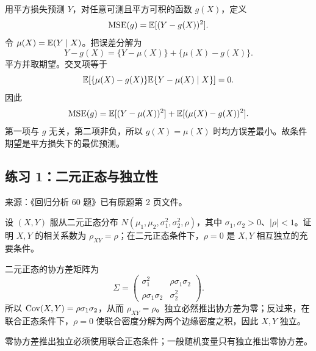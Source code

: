 \begin{proposition}\label{hw:reg:note:1:3}
用平方损失预测 $Y$，对任意可测且平方可积的函数 $g(X)$，定义
\[
\operatorname{MSE}(g)=\mathbb{E}[(Y-g(X))^2].
\]
令 $\mu(X)=\mathbb{E}(Y\mid X)$。把误差分解为
\[
Y-g(X)=\{Y-\mu(X)\}+\{\mu(X)-g(X)\}.
\]
平方并取期望。交叉项等于
\[
\mathbb{E}\!\left[\{\mu(X)-g(X)\}\mathbb{E}\{Y-\mu(X)\mid X\}\right]=0.
\]
因此
\[
\operatorname{MSE}(g)
=\mathbb{E}[(Y-\mu(X))^2]+\mathbb{E}[(\mu(X)-g(X))^2].
\]
第一项与 $g$ 无关，第二项非负，所以 $g(X)=\mu(X)$ 时均方误差最小。故条件期望是平方损失下的最优预测。
\end{proposition}


\subsection*{练习 1：二元正态与独立性}
\begin{homework}[练习 1]
\textsf{来源：《回归分析 60 题》已有原题第 2 页文件。}\par
设 $(X,Y)$ 服从二元正态分布 $N(\mu_1,\mu_2,\sigma_1^2,\sigma_2^2,\rho)$，其中 $\sigma_1,\sigma_2>0$、$|\rho|<1$。证明 $X,Y$ 的相关系数为 $\rho_{XY}=\rho$；在二元正态条件下，$\rho=0$ 是 $X,Y$ 相互独立的充要条件。
\end{homework}
\begin{solution}
二元正态的协方差矩阵为
\[
\Sigma=\begin{pmatrix}
\sigma_1^2&\rho\sigma_1\sigma_2\\
\rho\sigma_1\sigma_2&\sigma_2^2
\end{pmatrix}.
\]
所以 $\operatorname{Cov}(X,Y)=\rho\sigma_1\sigma_2$，从而 $\rho_{XY}=\rho$。独立必然推出协方差为零；反过来，在联合正态条件下，$\rho=0$ 使联合密度分解为两个边缘密度之积，因此 $X,Y$ 独立。
\end{solution}
\begin{dxtips}[二元正态与独立性]\label{hw:reg:tip:1}
零协方差推出独立必须使用联合正态条件；一般随机变量只有独立推出零协方差。
\end{dxtips}

